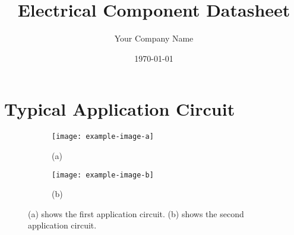 \documentclass[10pt,twocolumn]{article}
\title{Electrical Component Datasheet}
\author{Your Company Name}
\date{\today}
\begin{document}
\maketitle

\tableofcontents
\newpage

\section{Typical Application Circuit}
\begin{figure*}[htbp]
    \centering
    \begin{subfigure}{0.6\linewidth}
        \centering
        \texttt{[image: example-image-a]}
        \caption*{(a)}
        \label{fig:app-a}
    \end{subfigure}
    \par\medskip %
    \begin{subfigure}{0.6\linewidth}
        \centering
        \texttt{[image: example-image-b]}
        \caption*{(b)}
        \label{fig:app-b}
    \end{subfigure}
    \caption{
        (a) shows the first application circuit. (b) shows the second application circuit.
    }
    \label{fig:typical-app}
\end{figure*}
\end{document}
